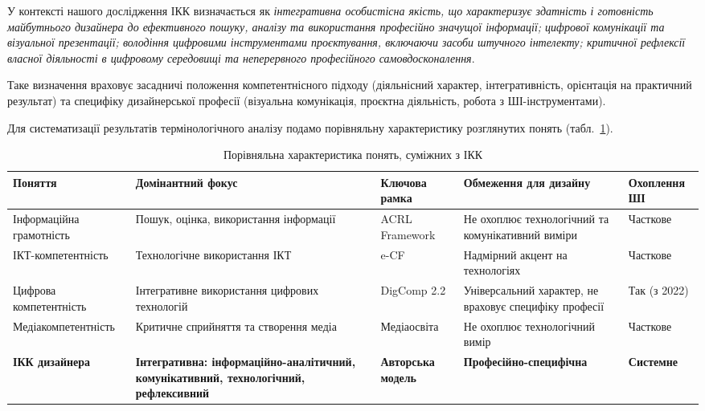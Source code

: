 У контексті нашого дослідження ІКК визначається як \textit{інтегративна особистісна якість, що характеризує здатність і готовність майбутнього дизайнера до ефективного пошуку, аналізу та використання професійно значущої інформації; цифрової комунікації та візуальної презентації; володіння цифровими інструментами проєктування, включаючи засоби штучного інтелекту; критичної рефлексії власної діяльності в цифровому середовищі та неперервного професійного самовдосконалення}.

Таке визначення враховує засадничі положення компетентнісного підходу (діяльнісний характер, інтегративність, орієнтація на практичний результат) та специфіку дизайнерської професії (візуальна комунікація, проєктна діяльність, робота з ШІ-інструментами).


Для систематизації результатів термінологічного аналізу подамо порівняльну характеристику розглянутих понять (табл.~\ref{tab:terminology_comparison}).

\begin{table}[!h]
\centering
\caption{Порівняльна характеристика понять, суміжних з ІКК}
\label{tab:terminology_comparison}
\small
\begin{tabular}{|p{2.6cm}|p{2.4cm}|p{2.5cm}|p{2.4cm}|p{2.5cm}|}
\hline
\textbf{Поняття} & \textbf{Домінантний фокус} & \textbf{Ключова рамка} & \textbf{Обмеження для дизайну} & \textbf{Охоплення ШІ} \\
\hline
Інформаційна грамотність & Пошук, оцінка, використання інформації & ACRL Framework & Не охоплює технологічний та комунікативний виміри & Часткове \\
\hline
ІКТ-компетентність & Технологічне використання ІКТ & e-CF & Надмірний акцент на технологіях & Часткове \\
\hline
Цифрова компетентність & Інтегративне використання цифрових технологій & DigComp 2.2 & Універсальний характер, не враховує специфіку професії & Так (з 2022) \\
\hline
Медіа\-компетентність & Критичне сприйняття та створення медіа & Медіаосвіта & Не охоплює технологічний вимір & Часткове \\
\hline
\textbf{ІКК дизайнера} & \textbf{Інтегративна: інформаційно-аналітичний, комунікативний, технологічний, рефлексивний} & \textbf{Авторська модель} & \textbf{Професійно-специфічна} & \textbf{Системне} \\
\hline
\end{tabular}
\end{table}

